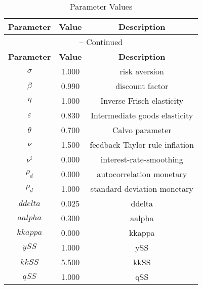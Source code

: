 \begin{center}
\begin{longtable}{ccc}
\caption{Parameter Values}\\%
\toprule%
\multicolumn{1}{c}{\textbf{Parameter}} &
\multicolumn{1}{c}{\textbf{Value}} &
 \multicolumn{1}{c}{\textbf{Description}}\\%
\midrule%
\endfirsthead
\multicolumn{3}{c}{{\tablename} \thetable{} -- Continued}\\%
\midrule%
\multicolumn{1}{c}{\textbf{Parameter}} &
\multicolumn{1}{c}{\textbf{Value}} &
  \multicolumn{1}{c}{\textbf{Description}}\\%
\midrule%
\endhead
$\sigma$ 	 & 	 1.000 	 & 	 risk aversion\\
$\beta$ 	 & 	 0.990 	 & 	 discount factor\\
$\eta$ 	 & 	 1.000 	 & 	 Inverse Frisch elasticity\\
$\varepsilon$ 	 & 	 0.830 	 & 	 Intermediate goods elasticity\\
$\theta$ 	 & 	 0.700 	 & 	 Calvo parameter\\
$\nu$ 	 & 	 1.500 	 & 	 feedback Taylor rule inflation\\
$\nu^i$ 	 & 	 0.000 	 & 	 interest-rate-smoothing\\
$\rho_d$ 	 & 	 0.000 	 & 	 autocorrelation monetary\\
$\rho_d$ 	 & 	 1.000 	 & 	 standard deviation monetary\\
$ddelta$ 	 & 	 0.025 	 & 	 ddelta\\
$aalpha$ 	 & 	 0.300 	 & 	 aalpha\\
$kkappa$ 	 & 	 0.000 	 & 	 kkappa\\
$ySS$ 	 & 	 1.000 	 & 	 ySS\\
$kkSS$ 	 & 	 5.500 	 & 	 kkSS\\
$qSS$ 	 & 	 1.000 	 & 	 qSS\\
\bottomrule%
\end{longtable}
\end{center}
